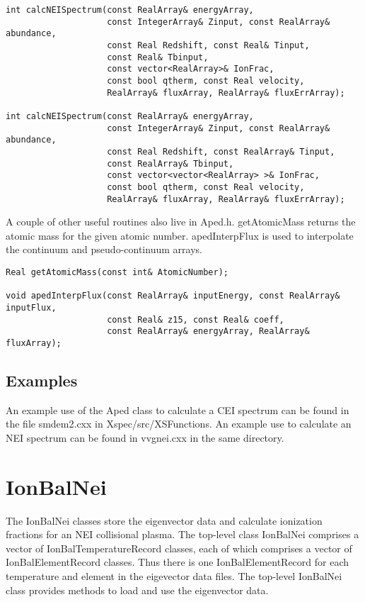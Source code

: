 \documentclass[11pt]{book}
\begin{document}
\begin{verbatim}
int calcNEISpectrum(const RealArray& energyArray, 
                    const IntegerArray& Zinput, const RealArray& abundance,
                    const Real Redshift, const Real& Tinput,
                    const Real& Tbinput,
                    const vector<RealArray>& IonFrac, 
                    const bool qtherm, const Real velocity,
                    RealArray& fluxArray, RealArray& fluxErrArray);

int calcNEISpectrum(const RealArray& energyArray, 
                    const IntegerArray& Zinput, const RealArray& abundance,
                    const Real Redshift, const RealArray& Tinput,
                    const RealArray& Tbinput,
                    const vector<vector<RealArray> >& IonFrac, 
                    const bool qtherm, const Real velocity,
                    RealArray& fluxArray, RealArray& fluxErrArray);
\end{verbatim}

A couple of other useful routines also live in Aped.h. getAtomicMass
returns the atomic mass for the given atomic number. apedInterpFlux is
used to interpolate the continuum and pseudo-continuum arrays.

\begin{verbatim}
Real getAtomicMass(const int& AtomicNumber);

void apedInterpFlux(const RealArray& inputEnergy, const RealArray& inputFlux, 
                    const Real& z15, const Real& coeff,
                    const RealArray& energyArray, RealArray&
fluxArray);
\end{verbatim}

\section{Examples}

An example use of the Aped class to calculate a CEI spectrum can be
found in the file smdem2.cxx in Xspec/src/XSFunctions. An example use
to calculate an NEI spectrum can be found in vvgnei.cxx in the same directory.

\chapter{IonBalNei}

The IonBalNei classes store the eigenvector data and calculate
ionization fractions for an NEI collisional plasma. The top-level
class IonBalNei comprises a vector of IonBalTemperatureRecord classes,
each of which comprises a vector of IonBalElementRecord classes. Thus
there is one IonBalElementRecord for each temperature and element in the
eigevector data files. The top-level IonBalNei class provides methods
to load and use the eigenvector data.
\end{document}
